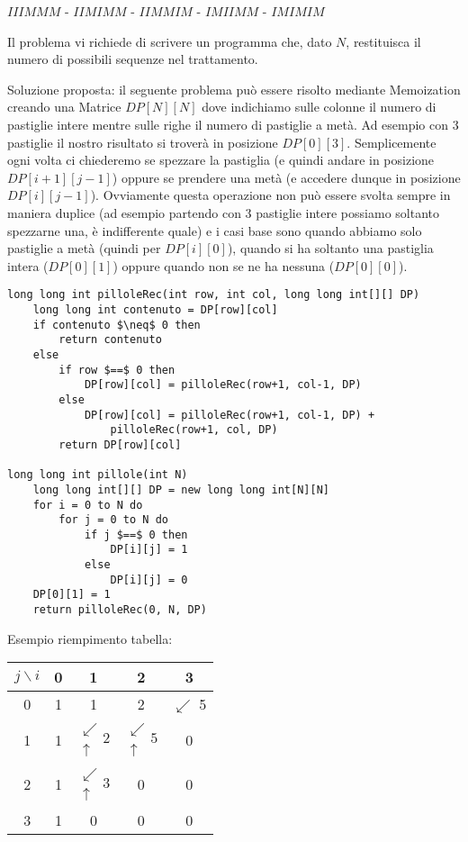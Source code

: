 \documentclass[../cheatSheetAlgoritmi.tex]{subfiles}
\begin{document}
$IIIMMM$ - $IIMIMM$ - $IIMMIM$ - $IMIIMM$ - $IMIMIM$

Il problema vi richiede di scrivere un programma che, dato $N$, restituisca il numero di possibili sequenze nel trattamento.

\bigskip

Soluzione proposta: il seguente problema può essere risolto mediante Memoization creando una Matrice $DP[N][N]$ dove indichiamo sulle colonne il numero di pastiglie intere mentre sulle righe il numero di pastiglie a metà. Ad esempio con 3 pastiglie il nostro risultato si troverà in posizione $DP[0][3]$. Semplicemente ogni volta ci chiederemo se spezzare la pastiglia (e quindi andare in posizione $DP[i+1][j-1]$) oppure se prendere una metà (e accedere dunque in posizione $DP[i][j-1]$). Ovviamente questa operazione non può essere svolta sempre in maniera duplice (ad esempio partendo con 3 pastiglie intere possiamo soltanto spezzarne una, è indifferente quale) e i casi base sono quando abbiamo solo pastiglie a metà (quindi per $DP[i][0]$), quando si ha soltanto una pastiglia intera ($DP[0][1]$) oppure quando non se ne ha nessuna ($DP[0][0]$).
\begin{lstlisting}[caption=Le pillole della Zia]
long long int pilloleRec(int row, int col, long long int[][] DP)
	long long int contenuto = DP[row][col]
	if contenuto $\neq$ 0 then
		return contenuto
	else
		if row $==$ 0 then
			DP[row][col] = pilloleRec(row+1, col-1, DP)
		else
			DP[row][col] = pilloleRec(row+1, col-1, DP) + 
				pilloleRec(row+1, col, DP)
		return DP[row][col]

long long int pillole(int N)
	long long int[][] DP = new long long int[N][N]
	for i = 0 to N do
		for j = 0 to N do
			if j $==$ 0 then
				DP[i][j] = 1
			else
				DP[i][j] = 0
	DP[0][1] = 1
	return pilloleRec(0, N, DP)
\end{lstlisting}
Esempio riempimento tabella:

\begin{center}
	\renewcommand{\arraystretch}{1.2}
	\begin{tabular}{ |c|c|c|c|c| } 
		\hline
			$j \backslash i$ &0 &1 &2 &3\\
		\hline
			0 &1 &1 &2 &$\swarrow$ 5\\
		\hline
			1 &1 & $\substack{\swarrow\\[-1em] \uparrow} 2$ & $\substack{\swarrow\\[-1em] \uparrow} 5$&0 \\
		\hline
			2 &1 & $\substack{\swarrow\\[-1em] \uparrow} 3$ &0 &0\\
		\hline
			3 &1 &0 &0 &0\\
		\hline
	\end{tabular}
\end{center}
 
\end{document}
